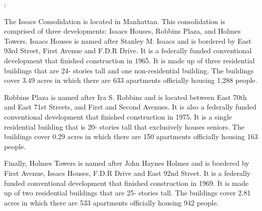 :      

    

The Issacs Consolidation is located in Manhattan. This consolidation is comprised of three developments: Isaacs Houses, Robbins Plaza, and Holmes Towers. Isaacs Houses is named after Stanley M. Isaacs and is bordered by East 93rd Street, First Avenue and F.D.R Drive. It is a federally funded conventional development that finished construction in 1965. It is made up of three residential buildings that are 24- stories tall and one non-residential building. The buildings cover 3.49 acres in which there are 633 apartments officially housing 1,288 people.  

Robbins Plaza is named after Ira S. Robbins and is located between East 70th and East 71st Streets, and First and Second Avenues. It is also a federally funded conventional development that finished construction in 1975. It is a single residential building that is 20- stories tall that exclusively houses seniors. The buildings cover 0.29 acres in which there are 150 apartments officially housing 163 people.  

Finally, Holmes Towers is named after John Haynes Holmes and is bordered by First Avenue, Issacs Houses, F.D.R Drive and East 92nd Street. It is a federally funded conventional development that finished construction in 1969. It is made up of two residential buildings that are 25- stories tall. The buildings cover 2.81 acres in which there are 533 apartments officially housing 942 people.  